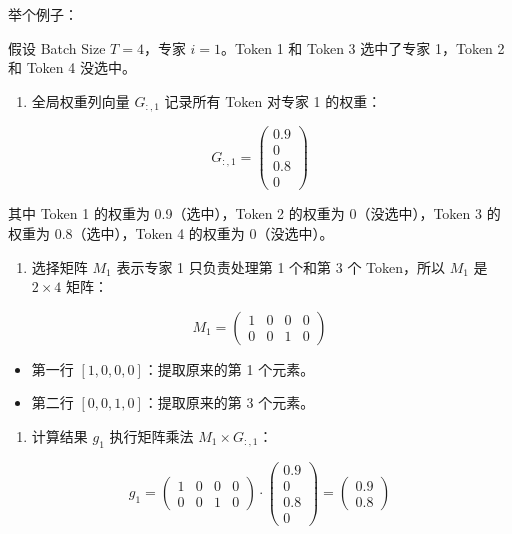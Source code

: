 举个例子：

假设 Batch Size \(T=4\)，专家 \(i=1\)。Token 1 和 Token 3 选中了专家 1，Token 2 和 Token 4 没选中。

\begin{enumerate}
\def\labelenumi{\arabic{enumi}.}
\tightlist
\item
  全局权重列向量 \(G_{:,1}\) 记录所有 Token 对专家 1 的权重：
\end{enumerate}

\[
G_{:,1} =
\begin{pmatrix}
0.9 \\
0 \\
0.8 \\
0
\end{pmatrix}
\]

其中 Token 1 的权重为 0.9（选中），Token 2 的权重为 0（没选中），Token 3 的权重为 0.8（选中），Token 4 的权重为 0（没选中）。

\begin{enumerate}
\def\labelenumi{\arabic{enumi}.}
\setcounter{enumi}{1}
\tightlist
\item
  选择矩阵 \(M_1\) 表示专家 1 只负责处理第 1 个和第 3 个 Token，所以 \(M_1\) 是 \(2 \times 4\) 矩阵：
\end{enumerate}

\[
M_1 =
\begin{pmatrix}
1 & 0 & 0 & 0 \\
0 & 0 & 1 & 0
\end{pmatrix}
\]

\begin{itemize}
\tightlist
\item
  第一行 \([1,0,0,0]\)：提取原来的第 1 个元素。
\item
  第二行 \([0,0,1,0]\)：提取原来的第 3 个元素。
\end{itemize}

\begin{enumerate}
\def\labelenumi{\arabic{enumi}.}
\setcounter{enumi}{2}
\tightlist
\item
  计算结果 \(g_1\) 执行矩阵乘法 \(M_1 \times G_{:,1}\)：
\end{enumerate}

\[
g_1 =
\begin{pmatrix}
1 & 0 & 0 & 0 \\
0 & 0 & 1 & 0
\end{pmatrix}
\cdot
\begin{pmatrix}
0.9 \\
0 \\
0.8 \\
0
\end{pmatrix}
=
\begin{pmatrix}
0.9 \\
0.8
\end{pmatrix}
\]

